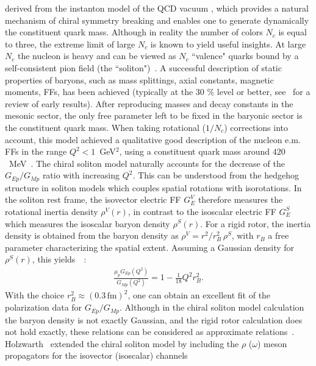 derived from the instanton model of the QCD vacuum \cite{Dia86}, which
provides a natural mechanism of chiral symmetry breaking 
and enables one to generate dynamically the constituent 
quark mass.  
Although in reality the number of colors $N_c$ is equal to three, 
the extreme limit of large $N_c$ is 
known to yield useful insights. At
large $N_c$ the nucleon is heavy and can 
be viewed as $N_c$ ``valence" quarks bound by a self-consistent pion
field (the ``soliton")~\cite{Dia88}.
A successful description of static properties of baryons, 
such as mass splittings, axial constants, magnetic moments, 
FFs, has been achieved (typically at the 30 \% level or better, 
see~\cite{Chr96} for a review of early results). 
After reproducing masses and decay constants in the mesonic sector, 
the only free parameter left to be fixed in the baryonic sector
is the constituent quark mass. 
When taking rotational ($1/N_c$) corrections into account, 
this model achieved a qualitative good description of the nucleon e.m. 
FFs in the range $Q^2 < 1$~GeV$^2$, using a constituent 
quark mass around $420$~MeV~\cite{Christov:1995hr}.
The chiral soliton model naturally accounts for the decrease of the 
$G_{Ep} / G_{Mp}$ ratio with increasing $Q^2$. This can be understood 
from the hedgehog structure in soliton models which couples spatial rotations 
with isorotations. In the soliton rest frame, the isovector electric FF 
$G_E^V$ therefore measures the rotational inertia density $\rho^V(r)$, in 
contrast to the isoscalar electric FF $G_E^S$ which measures the 
isoscalar baryon density $\rho^S(r)$. For a rigid rotor, 
the inertia density is obtained from the baryon density as 
$\rho^V = r^2/r_B^2 \, \rho^S$, with $r_B$ a free parameter characterizing 
the spatial extent. Assuming a Gaussian density for $\rho^S(r)$, 
this yields~\cite{holzwarth}~:
\begin{eqnarray}
\frac{\mu_p G_{Ep}(Q^2)}{G_{Mp}(Q^2)} = 
1 - \frac{1}{18} Q^2 r_B^2. 
\label{eq:gegmsol}
\end{eqnarray} 
With the choice $r_B^2 \approx (0.3 \, \mathrm{fm})^2$, one can obtain an 
excellent fit of the polarization data for $G_{Ep}/G_{Mp}$. 
Although in the chiral soliton model calculation 
the baryon density is not exactly Gaussian, 
and the rigid rotor calculation does not hold exactly, these relations can be 
considered as approximate relations~\cite{holzwarth}. 
\newline
\indent
Holzwarth~\cite{holzwarth} extended the chiral soliton model by including the 
$\rho$ ($\omega$) meson propagators for the isovector (isoscalar) channels 
